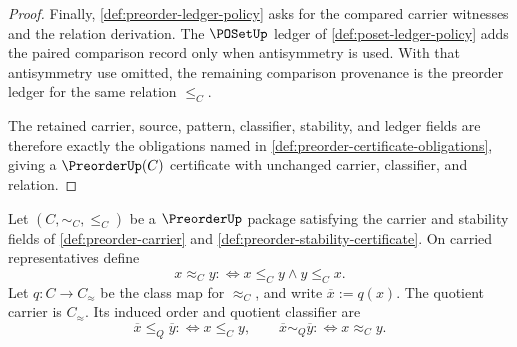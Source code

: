 \begin{proof}
Finally, \autoref{def:preorder-ledger-policy} asks for the compared carrier witnesses and the relation derivation. The $\POSetUp$ ledger of \autoref{def:poset-ledger-policy} adds the paired comparison record only when antisymmetry is used. With that antisymmetry use omitted, the remaining comparison provenance is the preorder ledger for the same relation $\le_C$.

The retained carrier, source, pattern, classifier, stability, and ledger fields are therefore exactly the obligations named in \autoref{def:preorder-certificate-obligations}, giving a $\PreorderUp(C)$ certificate with unchanged carrier, classifier, and relation.
\end{proof}

\begin{definition}
\label{def:preorder-quotient-presentation}
Let $(C,\sim_C,\le_C)$ be a $\PreorderUp$ package satisfying the carrier and stability fields of \autoref{def:preorder-carrier} and \autoref{def:preorder-stability-certificate}. On carried representatives define
$$
x\approx_C y :\Longleftrightarrow x\le_C y\land y\le_C x.
$$
Let $q:C\to C_{\!\approx}$ be the class map for $\approx_C$, and write $\overline{x}:=q(x)$. The quotient carrier is $C_{\!\approx}$. Its induced order and quotient classifier are
$$
\overline{x}\le_Q\overline{y} :\Longleftrightarrow x\le_C y,
\qquad
\overline{x}\sim_Q\overline{y} :\Longleftrightarrow x\approx_C y.
$$
\end{definition}

